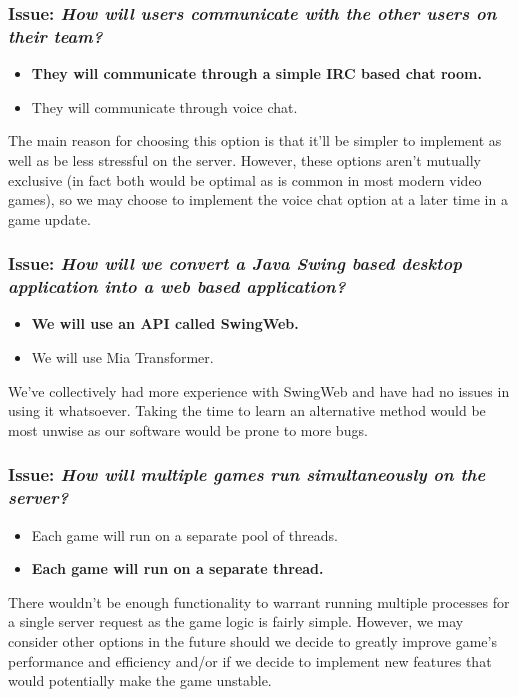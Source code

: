 \subsubsection*{Issue: \textit{How will users communicate with the other users on their team?}}

  \begin{itemize}
    \item \textbf{They will communicate through a simple IRC based chat room.}
    \item They will communicate through voice chat.
  \end{itemize}

The main reason for choosing this option is that it'll be simpler to implement as well as be less stressful on the server. However, these options aren't mutually exclusive (in fact both would be optimal as is common in most modern video games), so we may choose to implement the voice chat option at a later time in a game update.

\subsubsection*{Issue: \textit{How will we convert a Java Swing based desktop application into a web based application?}}

  \begin{itemize}
    \item \textbf{We will use an API called SwingWeb.}
    \item We will use Mia Transformer.
  \end{itemize}

We've collectively had more experience with SwingWeb and have had no issues in using it whatsoever. Taking the time to learn an alternative method would be most unwise as our software would be prone to more bugs.

\subsubsection*{Issue: \textit{How will multiple games run simultaneously on the server?}}

  \begin{itemize}
    \item Each game will run on a separate pool of threads.
    \item \textbf{Each game will run on a separate thread.}
  \end{itemize}

There wouldn't be enough functionality to warrant running multiple processes for a single server request as the game logic is fairly simple. However, we may consider other options in the future should we decide to greatly improve game's performance and efficiency and/or if we decide to implement new features that would potentially make the game unstable.

